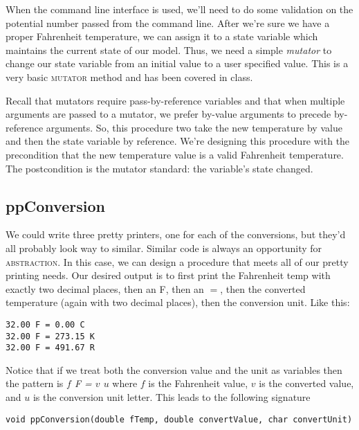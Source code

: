 \documentclass[]{tufte-handout}
\begin{document}
When the command line interface is used, we'll need to do some validation on the potential number passed from the command line. After we're sure we have a proper Fahrenheit temperature, we can assign it to a state variable which maintains the current state of our model.  Thus, we need a simple \textit{mutator} to change our state variable from an initial value to a user specified value. This is a very basic \textsc{mutator} method and has been covered in class. 

Recall that mutators require pass-by-reference variables and that when multiple arguments are passed to a mutator, we prefer by-value arguments to precede by-reference arguments. So, this procedure two take the new temperature by value and then the state variable by reference. We're designing this procedure with the precondition that the new temperature value is a valid Fahrenheit temperature. The postcondition is the mutator standard: the variable's state changed.

\subsection{ppConversion}

We could write three pretty printers, one for each of the conversions, but they'd all probably look way to similar. Similar code is always an opportunity for \textsc{abstraction}.  In this case, we can design a procedure that meets all of our pretty printing needs.  Our desired output is to first print the Fahrenheit temp with exactly two decimal places, then an F, then an $=$, then the converted temperature (again with two decimal places), then the conversion unit. Like this:

\begin{verbatim}
32.00 F = 0.00 C
32.00 F = 273.15 K
32.00 F = 491.67 R
\end{verbatim}

Notice that if we treat both the conversion value and the unit as variables then the pattern is \textit{$f$ F = $v$ $u$} where $f$ is the Fahrenheit value, $v$ is the converted value, and $u$ is the conversion unit letter.  This leads to the following signature

\begin{verbatim}
void ppConversion(double fTemp, double convertValue, char convertUnit)
\end{verbatim}
\end{document}
